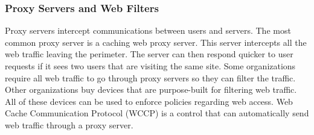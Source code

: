 \subsubsection{Proxy Servers and Web Filters}
Proxy servers intercept communications between users and servers. The most common proxy server is a caching web proxy server. This server intercepts all the web traffic leaving the perimeter. The server can then respond quicker to user requests if it sees two users that are visiting the same site. Some organizations require all web traffic to go through proxy servers so they can filter the traffic. Other organizations buy devices that are purpose-built for filtering web traffic. All of these devices can be used to enforce policies regarding web access. Web Cache Communication Protocol (WCCP) is a control that can automatically send web traffic through a proxy server.
